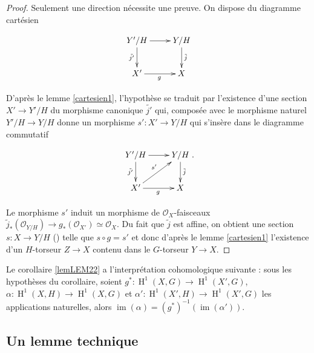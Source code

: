 \documentclass[11pt]{amsart}
\numberwithin{equation}{section}
\theoremstyle{definition}
\theoremstyle{remark}
\newcommand{\dO}{{\mathcal O}}
\DeclareMathOperator{\im}{im}
\DeclareMathOperator{\h}{H}
\begin{document}
\begin{proof}  Seulement une direction n\'ecessite une preuve. On dispose du diagramme cart\'esien

$$\xymatrix{
Y'/H \ar[r] \ar[d]_{\tilde {j'}}& Y/H \ar[d]^{\tilde j}\\
X' \ar[r]_g& X\\
}$$

D'apr\`es le lemme \ref{cartesien1}, l'hypoth\`ese se traduit par l'existence d'une section $X' \to Y' /H$ du morphisme canonique $\tilde {j'}$ qui, compos\'ee avec le morphisme naturel $Y'/ H \to Y/H$ donne un morphisme $s' :X' \to Y/H$ qui s'ins\`ere dans le diagramme commutatif

$$\xymatrix{
Y'/H \ar[r] \ar[d]_{\tilde {j'}}& Y/H \ar[d]^{\tilde j}\\
X' \ar[r]_g\ar[ru]^{s'}& X\\
}.$$



Le morphisme $s'$ induit un morphisme de $\dO_X$-faisceaux $\tilde j_*(\dO_{Y/H})\to g_*(\dO_{X'})\simeq \dO_{X}$. Du fait que $\tilde j$ est affine, on obtient une section $s:X\to Y/H$ (\cite[Lemma 28.11.5, Tag. 01SA]{ST}) telle que $s\circ g= s'$ et donc d'apr\`es le lemme \ref{cartesien1} l'existence d'un $H$-torseur $Z \to X$ contenu dans le $G$-torseur $Y \to X$. \end{proof}

Le corollaire \ref{lemLEM22} a l'interpr\'etation cohomologique suivante :  sous les hypoth\`eses du corollaire, soient $g^\ast: \h ^1(X, G)\to \h ^1(X',G)$, $\alpha :\h ^1(X,H)\to \h ^1(X,G)$  et $\alpha' :\h ^1(X',H)\to \h ^1(X',G)$ les applications naturelles, alors $\im (\alpha ) = (g^\ast )^{-1} (\im (\alpha '))$.


\subsection{Un lemme technique}
\end{document}
